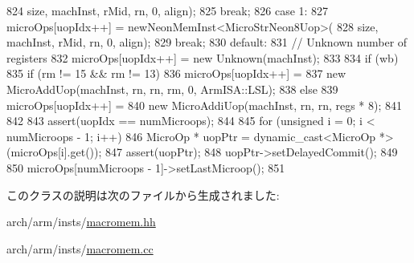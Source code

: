 \begin{DoxyCode}
{{824                 size, machInst, rMid, rn, 0, align);
825         break;
826       case 1:
827         microOps[uopIdx++] = newNeonMemInst<MicroStrNeon8Uop>(
828                 size, machInst, rMid, rn, 0, align);
829         break;
830       default:
831         // Unknown number of registers
832         microOps[uopIdx++] = new Unknown(machInst);
833     }
834     if (wb) {
835         if (rm != 15 && rm != 13) {
836             microOps[uopIdx++] =
837                 new MicroAddUop(machInst, rn, rn, rm, 0, ArmISA::LSL);
838         } else {
839             microOps[uopIdx++] =
840                 new MicroAddiUop(machInst, rn, rn, regs * 8);
841         }
842     }
843     assert(uopIdx == numMicroops);
844 
845     for (unsigned i = 0; i < numMicroops - 1; i++) {
846         MicroOp * uopPtr = dynamic_cast<MicroOp *>(microOps[i].get());
847         assert(uopPtr);
848         uopPtr->setDelayedCommit();
849     }
850     microOps[numMicroops - 1]->setLastMicroop();
851 }

\end{DoxyCode}


このクラスの説明は次のファイルから生成されました:\begin{DoxyCompactItemize}
\item 
arch/arm/insts/\hyperlink{macromem_8hh}{macromem.hh}\item 
arch/arm/insts/\hyperlink{macromem_8cc}{macromem.cc}\end{DoxyCompactItemize}
